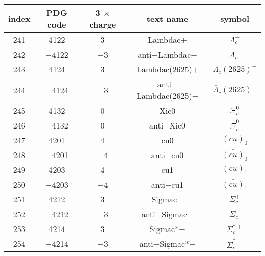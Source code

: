\documentclass{article}
\begin{document}
\begin{table}[!htbp]
\centering
\begin{tabular}{|c|c|c|c|c|}
\hline
index & PDG code & 3 $\times$ charge & text name & symbol \\
\hline
241 & 4122 & 3 & Lambda\underline{\hspace{0.6em}}c$+$ & $\Lambda_{c}^{+}$ \\
\hline
242 & $-$4122 & $-$3 & anti$-$Lambda\underline{\hspace{0.6em}}c$-$ & $\bar{\Lambda}_{c}^{-}$ \\
\hline
243 & 4124 & 3 & Lambda\underline{\hspace{0.6em}}c(2625)$+$ & $\Lambda_{c}(2625)^{+}$ \\
\hline
244 & $-$4124 & $-$3 & anti$-$Lambda\underline{\hspace{0.6em}}c(2625)$-$ & $\bar{\Lambda}_{c}(2625)^{-}$ \\
\hline
245 & 4132 & 0 & Xi\underline{\hspace{0.6em}}c0 & $\Xi_{c}^{0}$ \\
\hline
246 & $-$4132 & 0 & anti$-$Xi\underline{\hspace{0.6em}}c0 & $\bar{\Xi}_{c}^{0}$ \\
\hline
247 & 4201 & 4 & cu\underline{\hspace{0.6em}}0 & $(cu)_{0}$ \\
\hline
248 & $-$4201 & $-$4 & anti$-$cu\underline{\hspace{0.6em}}0 & $\bar{(cu)}_{0}$ \\
\hline
249 & 4203 & 4 & cu\underline{\hspace{0.6em}}1 & $(cu)_{1}$ \\
\hline
250 & $-$4203 & $-$4 & anti$-$cu\underline{\hspace{0.6em}}1 & $\bar{(cu)}_{1}$ \\
\hline
251 & 4212 & 3 & Sigma\underline{\hspace{0.6em}}c$+$ & $\Sigma_{c}^{+}$ \\
\hline
252 & $-$4212 & $-$3 & anti$-$Sigma\underline{\hspace{0.6em}}c$-$ & $\bar{\Sigma}_{c}^{-}$ \\
\hline
253 & 4214 & 3 & Sigma\underline{\hspace{0.6em}}c*$+$ & $\Sigma_{c}^{*+}$ \\
\hline
254 & $-$4214 & $-$3 & anti$-$Sigma\underline{\hspace{0.6em}}c*$-$ & $\bar{\Sigma}_{c}^{*-}$ \\

\end{tabular}
\end{table}
\end{document}
